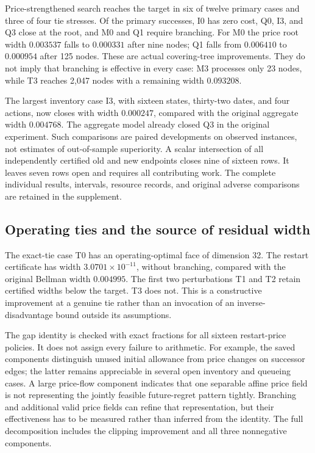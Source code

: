 Price-strengthened search reaches the target in six of twelve primary cases and three of four tie stresses. Of the primary successes, I0 has zero cost, Q0, I3, and Q3 close at the root, and M0 and Q1 require branching. For M0 the price root width $0.003537$ falls to $0.000331$ after nine nodes; Q1 falls from $0.006410$ to $0.000954$ after 125 nodes. These are actual covering-tree improvements. They do not imply that branching is effective in every case: M3 processes only 23 nodes, while T3 reaches 2,047 nodes with a remaining width $0.093208$.

The largest inventory case I3, with sixteen states, thirty-two dates, and four actions, now closes with width $0.000247$, compared with the original aggregate width $0.004768$. The aggregate model already closed Q3 in the original experiment. Such comparisons are paired developments on observed instances, not estimates of out-of-sample superiority. A scalar intersection of all independently certified old and new endpoints closes nine of sixteen rows. It leaves seven rows open and requires all contributing work. The complete individual results, intervals, resource records, and original adverse comparisons are retained in the supplement.

\subsection{Operating ties and the source of residual width}
The exact-tie case T0 has an operating-optimal face of dimension 32. The restart certificate has width $3.0701\times10^{-11}$, without branching, compared with the original Bellman width $0.004995$. The first two perturbations T1 and T2 retain certified widths below the target. T3 does not. This is a constructive improvement at a genuine tie rather than an invocation of an inverse-disadvantage bound outside its assumptions.

The gap identity is checked with exact fractions for all sixteen restart-price policies. It does not assign every failure to arithmetic. For example, the saved components distinguish unused initial allowance from price changes on successor edges; the latter remains appreciable in several open inventory and queueing cases. A large price-flow component indicates that one separable affine price field is not representing the jointly feasible future-regret pattern tightly. Branching and additional valid price fields can refine that representation, but their effectiveness has to be measured rather than inferred from the identity. The full decomposition includes the clipping improvement and all three nonnegative components.


